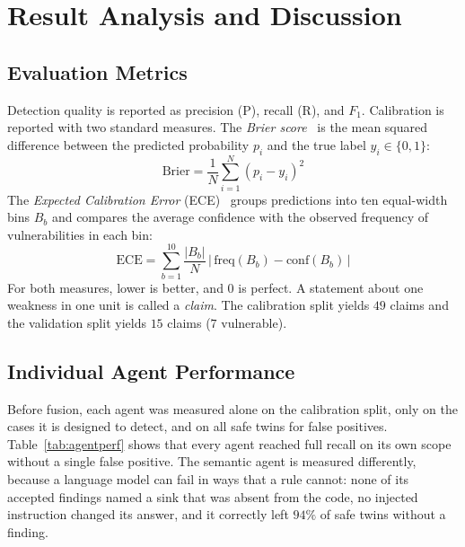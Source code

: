 \documentclass[conference]{IEEEtran}
\begin{document}
\section{Result Analysis and Discussion} \label{RES}

\subsection{Evaluation Metrics}
Detection quality is reported as precision (P), recall (R), and $F_1$.
Calibration is reported with two standard measures. The \emph{Brier
score}~\cite{brier1950} is the mean squared difference between the
predicted probability $p_i$ and the true label $y_i\in\{0,1\}$:
\begin{equation}
\mathrm{Brier}=\frac{1}{N}\sum_{i=1}^{N}\left(p_i-y_i\right)^2
\label{eq:brier}
\end{equation}
The \emph{Expected Calibration Error} (ECE)~\cite{guo2017calibration}
groups predictions into ten equal-width bins $B_b$ and compares the average
confidence with the observed frequency of vulnerabilities in each bin:
\begin{equation}
\mathrm{ECE}=\sum_{b=1}^{10}\frac{|B_b|}{N}\,
\bigl|\,\mathrm{freq}(B_b)-\mathrm{conf}(B_b)\,\bigr|
\label{eq:ece}
\end{equation}
For both measures, lower is better, and $0$ is perfect. A statement about
one weakness in one unit is called a \emph{claim}. The calibration split
yields $49$ claims and the validation split yields $15$ claims ($7$
vulnerable).

\subsection{Individual Agent Performance}
Before fusion, each agent was measured alone on the calibration split,
only on the cases it is designed to detect, and on all safe twins for
false positives. Table~\ref{tab:agentperf} shows that every agent reached
full recall on its own scope without a single false positive. The semantic
agent is measured differently, because a language model can fail in ways
that a rule cannot: none of its accepted findings named a sink that was
absent from the code, no injected instruction changed its answer, and it
correctly left $94\%$ of safe twins without a finding.
\end{document}

